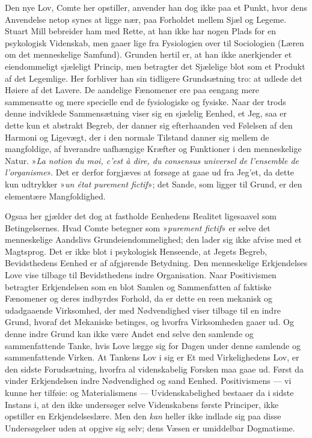 \documentclass[12pt,a4paper,openany]{book}
\newcommand{\opage}[1]{\marginnote{\footnotesize\textit{[#1]}}}
\begin{document}
Den nye Lov, Comte her opstiller, anvender han dog
ikke paa et Punkt, hvor dens Anvendelse netop synes at
ligge nær, paa Forholdet mellem Sjæl og Legeme. Stuart
Mill bebreider ham med Rette, at han ikke har nogen Plads
for en psykologisk Videnskab, men gaaer lige fra Fysiologien
over til Sociologien (Læren om det menneskelige Samfund).
Grunden hertil er, at han ikke anerkjender
et eiendommeligt sjæleligt Princip, men betragter det
Sjælelige blot som et Produkt af det Legemlige. Her forbliver
han sin tidligere Grundsætning tro: at udlede det
Høiere af det Lavere. De aandelige Fænomener ere paa
eengang mere sammensatte og mere specielle end de fysiologiske
og fysiske. Naar der trods denne indviklede Sammensætning
viser sig en sjælelig Eenhed, et Jeg, saa er dette kun et abstrakt
Begreb, der danner sig efterhaanden ved Følelsen af
den Harmoni og Ligevægt, der i den normale Tilstand danner
sig mellem de mangfoldige, af hverandre uafhængige Kræfter
og Funktioner i den menneskelige Natur. »\textit{La notion du
moi, c'est à dire, du consensus universel de l'ensemble de
l'organisme}». Det er derfor forgjæves at forsøge at gaae
ud fra Jeg'et, da dette kun udtrykker »\textit{un état purement
fictif}»; det Sande, som ligger til Grund, er den elementære
Mangfoldighed.

Ogsaa her gjælder det dog at fastholde Eenhedens
Realitet ligesaavel som Betingelsernes. Hvad Comte betegner
som »\textit{purement fictif}» er selve det menneskelige Aandslivs
Grundeiendommelighed; den lader sig ikke afvise med et
Magtsprog. Det er ikke blot i psykologisk Henseende, at
Jegets Begreb, Bevidsthedens Eenhed er af afgjørende Betydning.
Den menneskelige Erkjendelses Love vise tilbage til
Bevidsthedens indre Organisation. Naar Positivismen betragter
Erkjendelsen som en blot Samlen og Sammenfatten
af faktiske Fænomener og deres indbyrdes Forhold, da er
\opage{208}dette en reen mekanisk og udadgaaende Virksomhed, der med
Nødvendighed viser tilbage til en indre Grund, hvoraf det
Mekaniske betinges, og hvorfra Virksomheden gaaer ud.
Og denne indre Grund kan ikke være Andet end selve den
samlende og sammenfattende Tanke, hvis Love lægge sig for
Dagen under denne samlende og sammenfattende Virken.
At Tankens Lov i sig er Et med Virkelighedens Lov, er
den sidste Forudsætning, hvorfra al videnskabelig Forsken
maa gaae ud. Først da vinder Erkjendelsen indre Nødvendighed
og sand Eenhed. Positivismens --- vi kunne her
tilføie: og Materialismens --- Uvidenskabelighed bestaaer da i
sidste Instans i, at den ikke undersøger selve Videnskabens
første Principer, ikke opstiller en Erkjendelseslære. Men den
\emph{kan} heller ikke indlade sig paa disse Undersøgelser uden at
opgive sig selv; dens Væsen er umiddelbar Dogmatisme.
\end{document}
